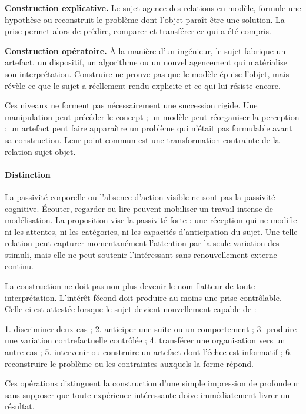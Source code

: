 \documentclass[10pt,a4paper]{article}
\begin{document}
\textbf{Construction explicative.} Le sujet agence des relations en modèle, formule une hypothèse ou reconstruit le problème dont l'objet paraît être une solution. La prise permet alors de prédire, comparer et transférer ce qui a été compris.

\textbf{Construction opératoire.} À la manière d'un ingénieur, le sujet fabrique un artefact, un dispositif, un algorithme ou un nouvel agencement qui matérialise son interprétation. Construire ne prouve pas que le modèle épuise l'objet, mais révèle ce que le sujet a réellement rendu explicite et ce qui lui résiste encore.

Ces niveaux ne forment pas nécessairement une succession rigide. Une manipulation peut précéder le concept ; un modèle peut réorganiser la perception ; un artefact peut faire apparaître un problème qui n'était pas formulable avant sa construction. Leur point commun est une transformation contrainte de la relation sujet-objet.

\paragraph{Distinction}
La passivité corporelle ou l'absence d'action visible ne sont pas la passivité cognitive. Écouter, regarder ou lire peuvent mobiliser un travail intense de modélisation. La proposition vise la passivité forte : une réception qui ne modifie ni les attentes, ni les catégories, ni les capacités d'anticipation du sujet. Une telle relation peut capturer momentanément l'attention par la seule variation des stimuli, mais elle ne peut soutenir l'intéressant sans renouvellement externe continu.

La construction ne doit pas non plus devenir le nom flatteur de toute interprétation. L'intérêt fécond doit produire au moins une prise contrôlable. Celle-ci est attestée lorsque le sujet devient nouvellement capable de :

1. discriminer deux cas ; 2. anticiper une suite ou un comportement ; 3. produire une variation contrefactuelle contrôlée ; 4. transférer une organisation vers un autre cas ; 5. intervenir ou construire un artefact dont l'échec est informatif ; 6. reconstruire le problème ou les contraintes auxquels la forme répond.

Ces opérations distinguent la construction d'une simple impression de profondeur sans supposer que toute expérience intéressante doive immédiatement livrer un résultat.
\end{document}
